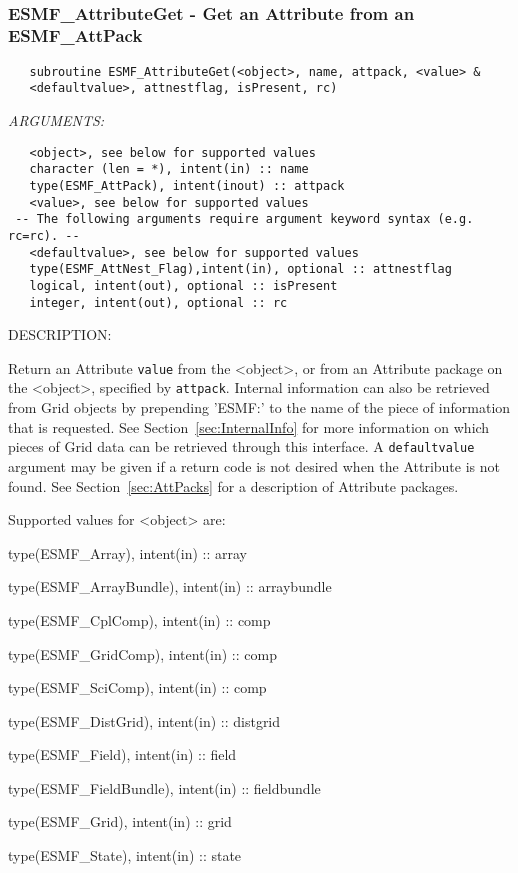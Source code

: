 \mbox{}\hrulefill\ 
 
\subsubsection [ESMF\_AttributeGet] {ESMF\_AttributeGet - Get an Attribute from an ESMF\_AttPack}


  
\begin{verbatim}   subroutine ESMF_AttributeGet(<object>, name, attpack, <value> &
   <defaultvalue>, attnestflag, isPresent, rc)\end{verbatim}{\em ARGUMENTS:}
\begin{verbatim}   <object>, see below for supported values
   character (len = *), intent(in) :: name
   type(ESMF_AttPack), intent(inout) :: attpack
   <value>, see below for supported values
 -- The following arguments require argument keyword syntax (e.g. rc=rc). --
   <defaultvalue>, see below for supported values
   type(ESMF_AttNest_Flag),intent(in), optional :: attnestflag
   logical, intent(out), optional :: isPresent
   integer, intent(out), optional :: rc\end{verbatim}
{\sf DESCRIPTION:\\ }


   Return an Attribute {\tt value} from the <object>, or from an Attribute
   package on the <object>, specified by {\tt attpack}. Internal information can also
   be retrieved from Grid objects by prepending 'ESMF:' to the name of the
   piece of information that is requested. See
   Section~\ref{sec:InternalInfo} for more information
   on which pieces of Grid data can be retrieved through this interface.
   A {\tt defaultvalue} argument
   may be given if a return code is not desired when the Attribute is not
   found. See Section~\ref{sec:AttPacks} for a description of Attribute
   packages.
  
   Supported values for <object> are:
   \begin{description}
   \item type(ESMF\_Array), intent(in) :: array
   \item type(ESMF\_ArrayBundle), intent(in) :: arraybundle
   \item type(ESMF\_CplComp), intent(in) :: comp
   \item type(ESMF\_GridComp), intent(in) :: comp
   \item type(ESMF\_SciComp), intent(in) :: comp
   \item type(ESMF\_DistGrid), intent(in) :: distgrid
   \item type(ESMF\_Field), intent(in) :: field
   \item type(ESMF\_FieldBundle), intent(in) :: fieldbundle
   \item type(ESMF\_Grid), intent(in) :: grid
   \item type(ESMF\_State), intent(in) :: state
   \end{description}
  
